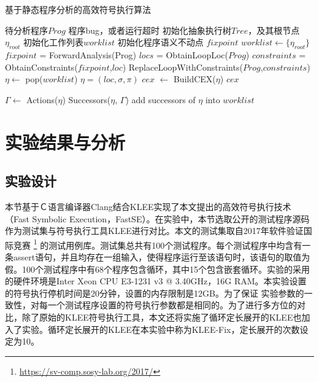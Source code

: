 \begin{algorithm}[h]
\renewcommand{\algorithmicrequire}{\textbf{Input:}}
\renewcommand{\algorithmicensure}{\textbf{Output:}}
\caption{基于静态程序分析的高效符号执行算法}
\label{algo-absint-symexe}
\begin{algorithmic}[1]
\REQUIRE 待分析程序$Prog$
\ENSURE 程序bug，或者运行超时
\STATE 初始化抽象执行树$Tree$，及其根节点$\eta_{root}$
\STATE 初始化工作列表$worklist$
\STATE 初始化程序语义不动点 $fixpoint$
\STATE $worklist \gets \{\eta_{root}\}$
\STATE $fixpoint$ = ForwardAnalysis(Prog)
\STATE $locs$ = ObtainLoopLoc($Prog$)
\STATE $constraints$ = ObtainConstraints($fixpoint$,$loc$)
\STATE ReplaceLoopWithConstraints($Prog$,$constraints$)
\ENDFOR
\ENDIF
{}
	\STATE $\eta \gets $ pop($worklist$)
		\STATE $\eta = (loc, \sigma, \pi)$
			\STATE $\mathit{cex}$ $\gets$ BuildCEX($\eta$)
			\RETURN $\mathit{cex}$
		\ENDIF
	
	\ELSE
		\STATE $\Gamma \gets $ Actions($\eta$)
		\STATE Successors($\eta$, $\Gamma$)
		\STATE add successors of $\eta$ into $worklist$
	\ENDIF
\ENDWHILE
\end{algorithmic}
\end{algorithm}


%



\section{实验结果与分析}
\label{sec-experiment}

\subsection{实验设计}
本节基于Ｃ语言编译器Clang结合KLEE实现了本文提出的高效符号执行技术（Fast Symbolic Execution，FastSE）。在实验中，本节选取公开的测试程序源码作为测试集与符号执行工具KLEE进行对比。本文的测试集取自2017年软件验证国际竞赛
\footnote{\url{https://sv-comp.sosy-lab.org/2017/}}
的测试用例库。测试集总共有100个测试程序。每个测试程序中均含有一条assert语句，并且均存在一组输入，使得程序运行至该语句时，该语句的取值为假。100个测试程序中有68个程序包含循环，其中15个包含嵌套循环。实验的采用的硬件环境是Inter Xeon CPU E3-1231 v3 @ 3.40GHz，16G RAM。本实验设置的符号执行停机时间是20分钟，设置的内存限制是12GB。为了保证
实验参数的一致性，对每一个测试程序设置的符号执行参数都是相同的。为了进行多方位的对比，除了原始的KLEE符号执行工具，本文还将实施了循环定长展开的KLEE也加入了实验。循环定长展开的KLEE在本实验中称为KLEE-Fix，定长展开的次数设定为10。
